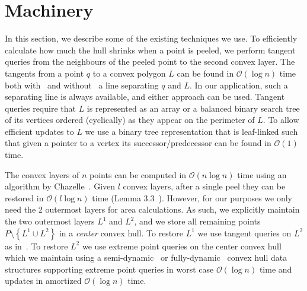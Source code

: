 \documentclass{cccg24}
\newcommand{\Oh}[1]{\mathcal{O}\!\lrParents{#1}}
\newcommand{\lrCurlyBrackets}[1]{\left\{ #1 \right\}}
\newcommand{\lrParents}[1]{\left( #1 \right)}
\newcommand{\logn}{\log{n}}
\begin{document}



\section{Machinery}

In this section, we describe some of the existing techniques we use. To efficiently calculate how much the hull shrinks when a point is peeled, we perform tangent queries from the neighbours of the peeled point to the second convex layer. %
The tangents from a point $q$ to a convex polygon $L$ can be found in $\Oh{\logn}$ time both with~\cite{1981_overmars_maintenance_2D_convex_hull_tangent_with_seprating_line} and without~\cite{1995_kirkpatrick_Snoeyink_tangents_without_separating_line} a line separating $q$ and $L$. In our application, such a separating line is always available, and either approach can be used. 
Tangent queries require that $L$ is represented as an array or a balanced binary search tree of its vertices ordered (cyclically) as they appear on the perimeter of $L$. To allow efficient updates to $L$ we use a binary tree representation that is leaf-linked such that given a pointer to a vertex its successor/predecessor can be found in $\Oh{1}$ time. %

The convex layers of $n$ points can be computed in $\Oh{n\logn}$ time using an algorithm by Chazelle~\cite{1985_chazelle_convex_layers}. 
Given $l$ convex layers, after a single peel they can be restored in $\Oh{l\logn}$ time (Lemma 3.3~\cite{loffler2014unions}). %
However, for our purposes we only need the 2 outermost layers for area calculations. As such, we explicitly maintain the two outermost layers $L^1$ and $L^2$, and we store all remaining points $P \setminus \lrCurlyBrackets{L^1 \cup L^2}$ in a \emph{center} convex hull. To restore $L^1$ we use tangent queries on $L^2$ as in~\cite{loffler2014unions}. To restore $L^2$ we use extreme point queries on the center convex hull which we maintain using a semi-dynamic~\cite{1992_hershberger_semi_dynamic_CH} or fully-dynamic~\cite{2002_brodal_rico_dynamic_CH} convex hull data structures supporting extreme point queries in worst case $\Oh{\logn}$ time and updates in amortized $\Oh{\logn}$ time. %
\end{document}
